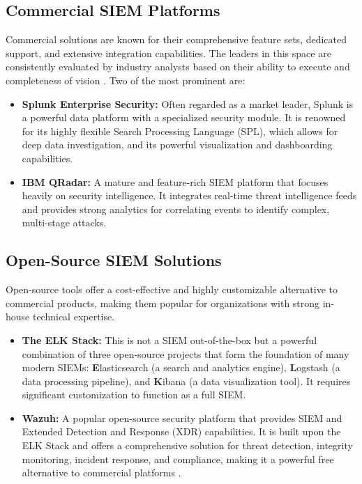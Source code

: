 \subsection{Commercial SIEM Platforms}
Commercial solutions are known for their comprehensive feature sets, dedicated support, and extensive integration capabilities. The leaders in this space are consistently evaluated by industry analysts based on their ability to execute and completeness of vision \cite{gartner_siem_2022}. Two of the most prominent are:
\begin{itemize}
    \item \textbf{Splunk Enterprise Security:} Often regarded as a market leader, Splunk is a powerful data platform with a specialized security module. It is renowned for its highly flexible Search Processing Language (SPL), which allows for deep data investigation, and its powerful visualization and dashboarding capabilities.
    \item \textbf{IBM QRadar:} A mature and feature-rich SIEM platform that focuses heavily on security intelligence. It integrates real-time threat intelligence feeds and provides strong analytics for correlating events to identify complex, multi-stage attacks.
\end{itemize}

\subsection{Open-Source SIEM Solutions}
Open-source tools offer a cost-effective and highly customizable alternative to commercial products, making them popular for organizations with strong in-house technical expertise.
\begin{itemize}
    \item \textbf{The ELK Stack:} This is not a SIEM out-of-the-box but a powerful combination of three open-source projects that form the foundation of many modern SIEMs: \textbf{E}lasticsearch (a search and analytics engine), \textbf{L}ogstash (a data processing pipeline), and \textbf{K}ibana (a data visualization tool). It requires significant customization to function as a full SIEM. \cite{elastic_stack}
    \item \textbf{Wazuh:} A popular open-source security platform that provides SIEM and Extended Detection and Response (XDR) capabilities. It is built upon the ELK Stack and offers a comprehensive solution for threat detection, integrity monitoring, incident response, and compliance, making it a powerful free alternative to commercial platforms \cite{wazuh_docs}.
\end{itemize}



